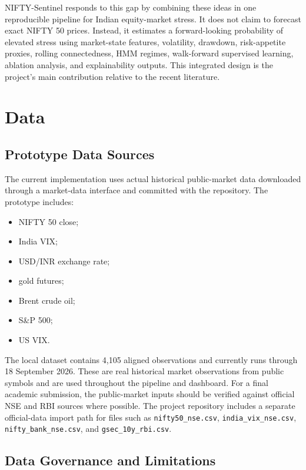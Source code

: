 \documentclass[12pt,a4paper]{article}
\begin{document}
NIFTY-Sentinel responds to this gap by combining these ideas in one reproducible pipeline for Indian equity-market stress. It does not claim to forecast exact NIFTY 50 prices. Instead, it estimates a forward-looking probability of elevated stress using market-state features, volatility, drawdown, risk-appetite proxies, rolling connectedness, HMM regimes, walk-forward supervised learning, ablation analysis, and explainability outputs. This integrated design is the project's main contribution relative to the recent literature.

\section{Data}

\subsection{Prototype Data Sources}

The current implementation uses actual historical public-market data downloaded through a market-data interface and committed with the repository. The prototype includes:

\begin{itemize}
    \item NIFTY 50 close;
    \item India VIX;
    \item USD/INR exchange rate;
    \item gold futures;
    \item Brent crude oil;
    \item S\&P 500;
    \item US VIX.
\end{itemize}

The local dataset contains 4,105 aligned observations and currently runs through 18 September 2026. These are real historical market observations from public symbols and are used throughout the pipeline and dashboard. For a final academic submission, the public-market inputs should be verified against official NSE and RBI sources where possible. The project repository includes a separate official-data import path for files such as \texttt{nifty50\_nse.csv}, \texttt{india\_vix\_nse.csv}, \texttt{nifty\_bank\_nse.csv}, and \texttt{gsec\_10y\_rbi.csv}.

\subsection{Data Governance and Limitations}
\end{document}

